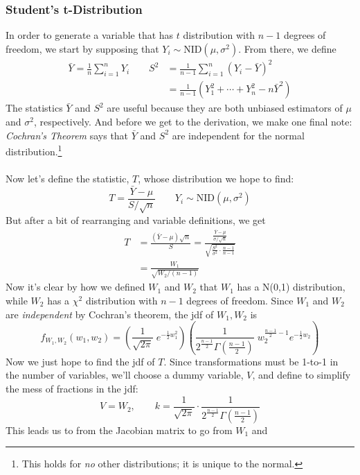 \documentclass[a4paper,12pt]{scrartcl}
\begin{document}
\subsubsection{Student's t-Distribution}

In order to generate a variable that has $t$ distribution with
$n-1$ degrees of freedom,
we start by supposing that $Y_i\sim \text{NID}(\mu,\sigma^2)$. From
there, we define
\begin{align*}
   \bar{Y} = \frac{1}{n} \sum^n_{i=1} Y_i \qquad
   S^2 &= \frac{1}{n-1} \sum^n_{i=1} (Y_i - \bar{Y})^2 \\
   &=\frac{1}{n-1} \left( Y_1^2 + \cdots + Y_n^2 - n \bar{Y}^2\right)
\end{align*}
The statistics $\bar{Y}$ and $S^2$ are useful because they are both
unbiased estimators of $\mu$ and $\sigma^2$, respectively.
And before we get to the derivation, we make one final note:
\emph{Cochran's Theorem}
says that $\bar{Y}$ and $S^2$ are independent for the normal
distribution.\footnote{This holds for \emph{no} other distributions;
it is unique to the normal.}
\\
\\
Now let's define the statistic, $T$,
whose distribution we hope to find:
   \[ T = \frac{\bar{Y}-\mu}{S/\sqrt{n}} \qquad Y_i \sim \text{NID}(\mu,
      \sigma^2) \]
But after a bit of rearranging and variable definitions, we get
\begin{align*}
   T &= \frac{(\bar{Y}-\mu)\sqrt{n} }{S} = \frac{
      \frac{\bar{Y}-\mu}{\sigma/\sqrt{n}}}{\sqrt{\frac{S^2}{\sigma^2}
      \cdot \frac{n-1}{n-1}}} \\
      &= \frac{W_1}{\sqrt{W_2 / (n-1)}}
\end{align*}
Now it's clear by how we defined $W_1$ and $W_2$ that $W_1$ has a
N(0,1) distribution, while $W_2$ has a $\chi^2$ distribution with
$n-1$ degrees of freedom. Since $W_1$ and $W_2$ are \emph{independent}
by Cochran's theorem, the jdf of $W_1, W_2$ is
   \[ f_{W_1, W_2}(w_1, w_2) = \left(
      \frac{1}{\sqrt{2\pi}} \; e^{-\frac{1}{2} w_1^2}\right)\left(
      \frac{1}{ 2^{\frac{n-1}{2}} \Gamma\left(\frac{n-1}{2}\right)}
      \; w_2^{\frac{n-1}{2} -1} e^{-\frac{1}{2}
      w_2}\right)
      \]
Now we just hope to find the jdf of $T$. Since transformations must be
1-to-1 in the number of variables, we'll choose
a dummy variable, $V$, and define to simplify the mess of fractions
in the jdf:
\[ V =W_2, \qquad k = \frac{1}{\sqrt{2\pi}} \cdot \frac{1}{
   2^{\frac{n-1}{2}} \Gamma\left(\frac{n-1}{2}\right)} \]
This leads us to from the Jacobian matrix to go from $W_1$ and
\end{document}
